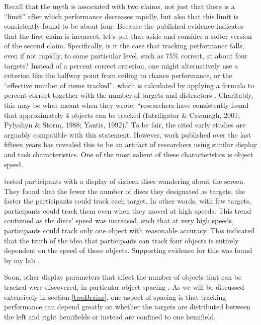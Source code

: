 \documentclass[
]{book}
\begin{document}
Recall that the myth is associated with two claims, not just that there is a ``limit'' after which performance decreases rapidly, but also that this limit is consistently found to be about four. Because the published evidence indicates that the first claim is incorrect, let's put that aside and consider a softer version of the second claim. Specifically, is it the case that tracking performance falls, even if not rapidly, to some particular level, such as 75\% correct, at about four targets? Instead of a percent correct criterion, one might alternatively use a criterion like the halfway point from ceiling to chance performance, or the ``effective number of items tracked'', which is calculated by applying a formula to percent correct together with the number of targets and distractors \citep{schollWhatVisualObject2001}. Charitably, this may be what \citet{alvarezHowManyObjects2007} meant when they wrote: ``researchers have consistently found that approximately 4 objects can be tracked (Intriligator \& Cavanagh, 2001; Pylyshyn \& Storm, 1988; Yantis, 1992).'' To be fair, the cited early studies are arguably compatible with this statement.
However, work published over the last fifteen years has revealed this to be an artifact of researchers using similar display and task characteristics. One of the most salient of these characteristics is object speed.

\citet{alvarezHowManyObjects2007} tested participants with a display of sixteen discs wandering about the screen. They found that the fewer the number of discs they designated as targets, the faster the participants could track each target. In other words, with few targets, participants could track them even when they moved at high speeds. This trend continued as the discs' speed was increased, such that at very high speeds, participants could track only one object with reasonable accuracy. This indicated that the truth of the idea that participants can track four objects is entirely dependent on the speed of those objects. Supporting evidence for this was found by my lab \citep{holcombeExhaustingAttentionalTracking2012}.

Soon, other display parameters that affect the number of objects that can be tracked were discovered, in particular object spacing \citep{franconeriEvidenceSpeedLimit2008, holcombeObjectTrackingAbsence2014}. As we will be discussed extensively in section \ref{twoBrains}, one aspect of spacing is that tracking performance can depend greatly on whether the targets are distributed between the left and right hemifields or instead are confined to one hemifield.
\end{document}
